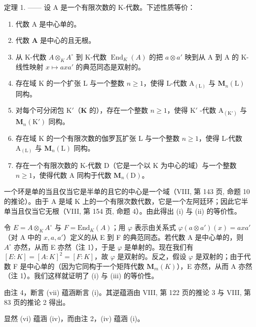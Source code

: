 定理 1. —— 设 A 是一个有限次数的 K-代数。下述性质等价：

\begin{enumerate}
\def\labelenumi{(\roman{enumi})}
\item
  代数 A 是中心单的。
\item
  代数 \(\mathbf{A}\) 是中心的且无根。
\item
  从 K-代数 \(A \otimes_{K} A^{\circ}\) 到 K-代数 \(\operatorname{End}_{K}(A)\) 的把 \(a \otimes a'\) 映到从 A 到 A 的 K-线性映射 \(x \mapsto axa'\) 的典范同态是双射的。
\item
  存在域 K 的一个扩张 L 与一个整数 \(n \geqslant 1\)，使得 L-代数 \(\mathrm{A}_{(\mathrm{L})}\) 与 \(\mathbf{M}_{n}(\mathrm{L})\) 同构。
\item
  对每个可分闭包 \(\mathrm{K}'\)（\(\mathbf{K}\) 的），存在一个整数 \(n \geqslant 1\)，使得 \(\mathrm{K}'\) -代数 \(\mathrm{A}_{(\mathrm{K}')}\) 与 \(\mathbf{M}_n(\mathrm{K}')\) 同构。
\item
  存在域 K 的一个有限次数的伽罗瓦扩张 L 与一个整数 \(n \geqslant 1\)，使得 L-代数 \(\mathrm{A}_{(\mathrm{L})}\) 与 \(\mathbf{M}_n(\mathrm{L})\) 同构。
\item
  存在一个有限次数的 K-代数 D（它是一个以 K 为中心的域）与一个整数 \(n \geqslant 1\)，使得代数 A 同构于代数 \(\mathbf{M}_{n}(\mathrm{D})\)。
\end{enumerate}

一个环是单的当且仅当它是半单的且它的中心是一个域（VIII, 第 143 页, 命题 10 的推论）。由于 A 是域 K 上的一个有限次数代数，它是一个左阿廷环；因此它半单当且仅当它无根（VIII, 第 154 页, 命题 4）。由此得出 (i) 与 (ii) 的等价性。

令 \(E = A \otimes_{K} A^{\circ}\) 与 \(F = \text{End}_{K}(A)\)；用 \(\varphi\) 表示由关系式 \(\varphi(a \otimes a')(x) = axa'\)（对 A 中的 \(x, a, a'\)）定义的从 E 到 F 的典范同态。若代数 A 是中心单的，则 \(A^{\circ}\) 亦然，从而 E 亦然（注 1），于是 \(\varphi\) 是单射的。现在我们有 \([E : K] = [A : K]^{2} = [F : K]\)，故 \(\varphi\) 是双射的。反之，假设 \(\varphi\) 是双射的；由于代数 F 是中心单的（因为它同构于一个矩阵代数 \(\mathbf{M}_{m}(K)\)），E 亦然，从而 A 亦然（注 1）。我们这样就证明了 (i) 与 (iii) 的等价性。

由注 4，断言 (vii) 蕴涵断言 (i)。其逆蕴涵由 VIII, 第 122 页的推论 3 与 VIII, 第 83 页的推论 2 得出。

显然 (vi) 蕴涵 (iv)，而由注 2，(iv) 蕴涵 (i)。

